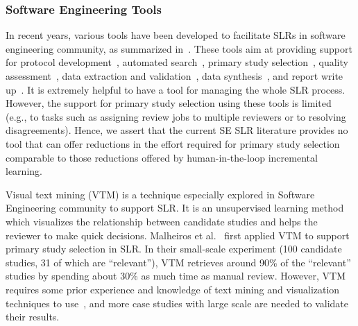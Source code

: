 \documentclass[final,twocolumn,5p]{elsarticle}
\theoremstyle{break}
\begin{document}
\subsubsection{Software Engineering Tools}

In recent years, various tools have been developed to facilitate SLRs in software engineering community, as summarized in~\cite{marshall2015tools,marshall2014tools,marshall2013tools}. These tools aim at providing support for protocol development~\cite{Molleri:2015:SWA:2745802.2745825,fernandez2010slr,hernandes2012using}, automated search~\cite{Molleri:2015:SWA:2745802.2745825,hernandes2012using}, primary study selection~\cite{Molleri:2015:SWA:2745802.2745825,hernandes2012using,fernandez2010slr,bowes2012slurp}, quality assessment~\cite{fernandez2010slr,bowes2012slurp,Molleri:2015:SWA:2745802.2745825}, data extraction and validation~\cite{Molleri:2015:SWA:2745802.2745825,hernandes2012using,fernandez2010slr,bowes2012slurp}, data synthesis~\cite{Molleri:2015:SWA:2745802.2745825,hernandes2012using,fernandez2010slr,bowes2012slurp},
and report write up~\cite{Molleri:2015:SWA:2745802.2745825,hernandes2012using,fernandez2010slr,bowes2012slurp}. It is extremely helpful to have a tool for managing the whole SLR process. However, the support for primary study selection using these tools is limited (e.g., to tasks such as assigning review jobs to multiple reviewers or to resolving disagreements).
Hence, we assert that the current SE SLR literature provides
no tool that can offer reductions in the effort required for primary study selection comparable to those reductions offered by human-in-the-loop incremental learning. 

Visual text mining (VTM) is a technique especially explored in Software Engineering community to support SLR. It is an unsupervised learning method which visualizes the relationship between candidate studies and helps the reviewer to make quick decisions. Malheiros et al.~\cite{malheiros2007visual} first applied VTM to support primary study selection in SLR. In their small-scale experiment (100 candidate studies, 31 of which are ``relevant''), VTM retrieves around 90\% of the ``relevant'' studies by spending about 30\% as much time as manual review. However, VTM requires some prior experience and knowledge of text mining and visualization techniques to use~\cite{bowes2012slurp}, and more case studies with large scale are needed to validate their results. 

\end{document}
